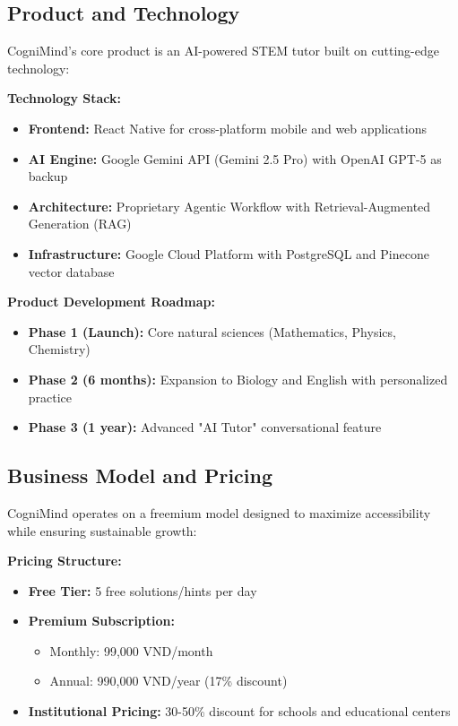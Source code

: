 \subsection{Product and Technology}
CogniMind's core product is an AI-powered STEM tutor built on cutting-edge technology:

\textbf{Technology Stack:}
\begin{itemize}
    \item \textbf{Frontend:} React Native for cross-platform mobile and web applications
    \item \textbf{AI Engine:} Google Gemini API (Gemini 2.5 Pro) with OpenAI GPT-5 as backup
    \item \textbf{Architecture:} Proprietary Agentic Workflow with Retrieval-Augmented Generation (RAG)
    \item \textbf{Infrastructure:} Google Cloud Platform with PostgreSQL and Pinecone vector database
\end{itemize}

\textbf{Product Development Roadmap:}
\begin{itemize}
    \item \textbf{Phase 1 (Launch):} Core natural sciences (Mathematics, Physics, Chemistry)
    \item \textbf{Phase 2 (6 months):} Expansion to Biology and English with personalized practice
    \item \textbf{Phase 3 (1 year):} Advanced "AI Tutor" conversational feature
\end{itemize}

\subsection{Business Model and Pricing}
CogniMind operates on a freemium model designed to maximize accessibility while ensuring sustainable growth:

\textbf{Pricing Structure:}
\begin{itemize}
    \item \textbf{Free Tier:} 5 free solutions/hints per day
    \item \textbf{Premium Subscription:} 
    \begin{itemize}
        \item Monthly: 99,000 VND/month
        \item Annual: 990,000 VND/year (17\% discount)
    \end{itemize}
    \item \textbf{Institutional Pricing:} 30-50\% discount for schools and educational centers
\end{itemize}

